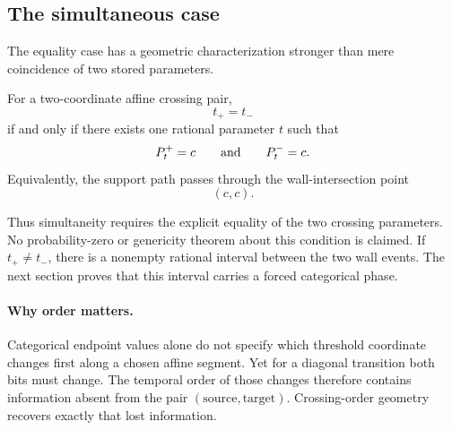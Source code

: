 \subsection{The simultaneous case}

The equality case has a geometric characterization stronger than mere coincidence of two stored parameters.

\begin{theorem}
For a two-coordinate affine crossing pair,
\[
  t_+=t_-
\]
if and only if there exists one rational parameter \(t\) such that
\[
  P^{+}_t=c
  \qquad\text{and}\qquad
  P^{-}_t=c.
\]
Equivalently, the support path passes through the wall-intersection point
\[
  (c,c).
\]
\statusverified
\end{theorem}

Thus simultaneity requires the explicit equality of the two crossing parameters. No probability-zero or genericity theorem about this condition is claimed. If \(t_+\neq t_-\), there is a nonempty rational interval between the two wall events. The next section proves that this interval carries a forced categorical phase.

\paragraph{Why order matters.}
Categorical endpoint values alone do not specify which threshold coordinate changes first along a chosen affine segment. Yet for a diagonal transition both bits must change. The temporal order of those changes therefore contains information absent from the pair \((\text{source},\text{target})\). Crossing-order geometry recovers exactly that lost information.
